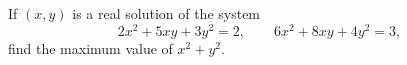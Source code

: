 If $(x,y)$ is a real solution of the system
\[
2x^2+5xy+3y^2=2,\qquad 6x^2+8xy+4y^2=3,
\]
find the maximum value of $x^2+y^2$.
